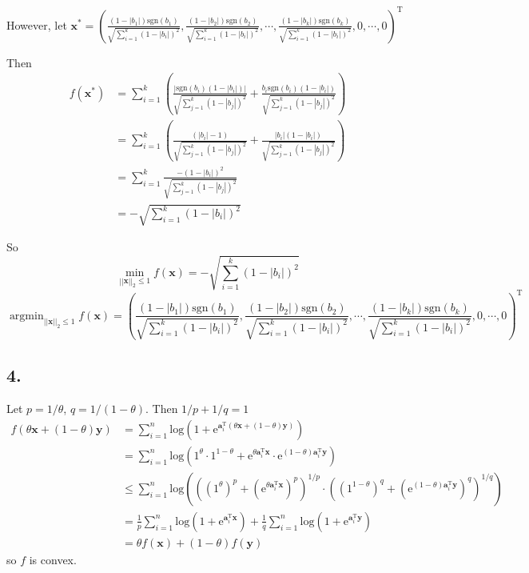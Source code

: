 \documentclass{article}
\begin{document}
However, let $\bm{x}^{*}=\left(\frac{(1-|b_{1}|)\mathrm{sgn}(b_{1})}{\sqrt{\sum_{i=1}^{k}(1-|b_{i}|)^{2}}},\frac{(1-|b_{2}|)\mathrm{sgn}(b_{2})}{\sqrt{\sum_{i=1}^{k}(1-|b_{i}|)^{2}}},\cdots,\frac{(1-|b_{k}|)\mathrm{sgn}(b_{k})}{\sqrt{\sum_{i=1}^{k}(1-|b_{i}|)^{2}}},0,\cdots,0\right)^{\mathrm{T}}$

Then
\begin{align*}
f(\bm{x}^{*})&=\sum_{i=1}^{k}\left(\frac{|\mathrm{sgn}(b_{i})(1-|b_{i}|)|}{\sqrt{\sum_{j=1}^{k}(1-|b_{j}|)^{2}}}+\frac{b_{i}\mathrm{sgn}(b_{i})(1-|b_{i}|)}{\sqrt{\sum_{j=1}^{k}(1-|b_{j}|)^{2}}}\right)\\
&=\sum_{i=1}^{k}\left(\frac{(|b_{i}|-1)}{\sqrt{\sum_{j=1}^{k}(1-|b_{j}|)^{2}}}+\frac{|b_{i}|(1-|b_{i}|)}{\sqrt{\sum_{j=1}^{k}(1-|b_{j}|)^{2}}}\right)\\
&=\sum_{i=1}^{k}\frac{-(1-|b_{i}|)^{2}}{\sqrt{\sum_{j=1}^{k}(1-|b_{j}|)^{2}}}\\
&=-\sqrt{\sum_{i=1}^{k}(1-|b_{i}|)^{2}}
\end{align*}

So
$$\min_{||\bm{x}||_{2}\leq1}f(\bm{x})=-\sqrt{\sum_{i=1}^{k}(1-|b_{i}|)^{2}}$$
$$\mathop{\arg\min}_{||\bm{x}||_{2}\leq1}f(\bm{x})=\left(\frac{(1-|b_{1}|)\mathrm{sgn}(b_{1})}{\sqrt{\sum_{i=1}^{k}(1-|b_{i}|)^{2}}},\frac{(1-|b_{2}|)\mathrm{sgn}(b_{2})}{\sqrt{\sum_{i=1}^{k}(1-|b_{i}|)^{2}}},\cdots,\frac{(1-|b_{k}|)\mathrm{sgn}(b_{k})}{\sqrt{\sum_{i=1}^{k}(1-|b_{i}|)^{2}}},0,\cdots,0\right)^{\mathrm{T}}$$

\subsection*{4.}
Let $p=1/\theta$, $q=1/(1-\theta)$. Then $1/p+1/q=1$
\begin{align*}
f(\theta\bm{x}+(1-\theta)\bm{y})&=\sum_{i=1}^{n}\mathrm{log}\left(1+\mathrm{e}^{\bm{a}_{i}^{\mathrm{T}}(\theta\bm{x}+(1-\theta)\bm{y})}\right)\\
&=\sum_{i=1}^{n}\mathrm{log}\left(1^{\theta}\cdot1^{1-\theta}+\mathrm{e}^{\theta\bm{a}_{i}^{\mathrm{T}}\bm{x}}\cdot\mathrm{e}^{(1-\theta)\bm{a}_{i}^{\mathrm{T}}\bm{y}}\right)\\
&\leq \sum_{i=1}^{n}\mathrm{log}\left(\left((1^{\theta})^{p}+(\mathrm{e}^{\theta\bm{a}_{i}^{\mathrm{T}}\bm{x}})^{p}\right)^{1/p}\cdot\left((1^{1-\theta})^{q}+(\mathrm{e}^{(1-\theta)\bm{a}_{i}^{\mathrm{T}}\bm{y}})^{q}\right)^{1/q}\right)\\
&=\frac{1}{p}\sum_{i=1}^{n}\mathrm{log}(1+\mathrm{e}^{\bm{a}_{i}^{\mathrm{T}}\bm{x}})+\frac{1}{q}\sum_{i=1}^{n}\mathrm{log}(1+\mathrm{e}^{\bm{a}_{i}^{\mathrm{T}}\bm{y}})\\
&=\theta f(\bm{x})+(1-\theta)f(\bm{y})
\end{align*}
so $f$ is convex.
\end{document}
